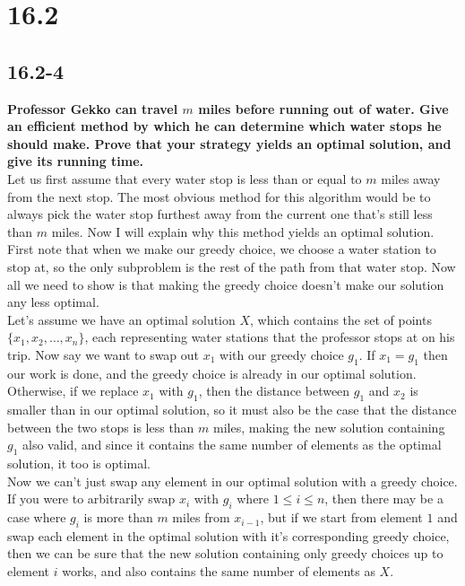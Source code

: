 \documentclass[11pt]{article}
\begin{document}
 \section*{16.2}
 \subsection*{16.2-4}
 \textbf{Professor Gekko can travel $m$ miles before running out of water. Give an efficient 
 method by which he can determine which water stops he should make. Prove that your strategy 
 yields an optimal solution, and give its running time.} \\

 Let us first assume that every water stop is less than or equal to $m$ miles away from the 
 next stop. The most obvious method for this algorithm would be to always pick the water stop 
 furthest away from the current one that's still less than $m$ miles.  Now I will explain why 
 this method yields an optimal solution. \\

 First note that when we make our greedy choice, we choose a water station to stop at, so the 
 only subproblem is the rest of the path from that water stop.  Now all we need to show is that 
 making the greedy choice doesn't make our solution any less optimal. \\

 Let's assume we have an optimal solution $X$, which contains the set of points 
 $\{x_1,x_2,\dots,x_n\}$, each representing water stations that the professor stops at on his 
 trip. Now say we want to swap out $x_1$ with our greedy choice $g_1$. If $x_1 = g_1$ then our 
 work is done, and the greedy choice is already in our optimal solution.  Otherwise, if we 
 replace $x_1$ with $g_1$, then the distance between $g_1$ and $x_2$ is smaller than in our 
 optimal solution, so it must also be the case that the distance between the two stops is less 
 than $m$ miles, making the new solution containing $g_1$ also valid, and since it contains the 
 same number of elements as the optimal solution, it too is optimal. \\

 Now we can't just swap any element in our optimal solution with a greedy choice. If you were 
 to arbitrarily swap $x_i$ with $g_i$ where $1 \leq i \leq n$, then there may be a case where 
 $g_i$ is more than $m$ miles from $x_{i-1}$, but if we start from element $1$ and swap each 
 element in the optimal solution with it's corresponding greedy choice, then we can be sure 
 that the new solution containing only greedy choices up to element $i$ works, and also 
 contains the same number of elements as $X$.
 \newpage
\end{document}
